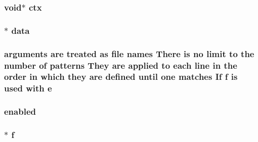 \subsubsection[{\texorpdfstring{ctx}{ctx}}]{ {\bf void}$\ast$ ctx}\hypertarget{group__APR__Util__Bucket__Brigades_ga0525238c5b09cb4ac5067ddec654d09c}{}\label{group__APR__Util__Bucket__Brigades_ga0525238c5b09cb4ac5067ddec654d09c}
\subsubsection[{\texorpdfstring{data}{data}}]{$\ast$ {\bf data}}\hypertarget{group__APR__Util__Bucket__Brigades_ga735984d41155bc1032e09bece8f8d66d}{}\label{group__APR__Util__Bucket__Brigades_ga735984d41155bc1032e09bece8f8d66d}
\subsubsection[{\texorpdfstring{e}{e}}]{ {\bf arguments} {\bf are} treated {\bf as} {\bf file} {\bf names} There {\bf is} no {\bf limit} {\bf to} the {\bf number} {\bf of} {\bf patterns} They {\bf are} applied {\bf to} each {\bf line} {\bf in} the {\bf order} {\bf in} {\bf which} they {\bf are} {\bf defined} until one {\bf matches} If {\bf f} {\bf is} {\bf used} {\bf with} e}\hypertarget{group__APR__Util__Bucket__Brigades_gacd90314acb2c2e5cd19681136c08efac}{}\label{group__APR__Util__Bucket__Brigades_gacd90314acb2c2e5cd19681136c08efac}
\subsubsection[{\texorpdfstring{enabled}{enabled}}]{ enabled}\hypertarget{group__APR__Util__Bucket__Brigades_ga03e6cca0c879c0443efb431c30c14f76}{}\label{group__APR__Util__Bucket__Brigades_ga03e6cca0c879c0443efb431c30c14f76}
\subsubsection[{\texorpdfstring{f}{f}}]{$\ast$ f}\hypertarget{group__APR__Util__Bucket__Brigades_ga08c56f8ee324f070de0f31b0bf87de72}{}\label{group__APR__Util__Bucket__Brigades_ga08c56f8ee324f070de0f31b0bf87de72}
